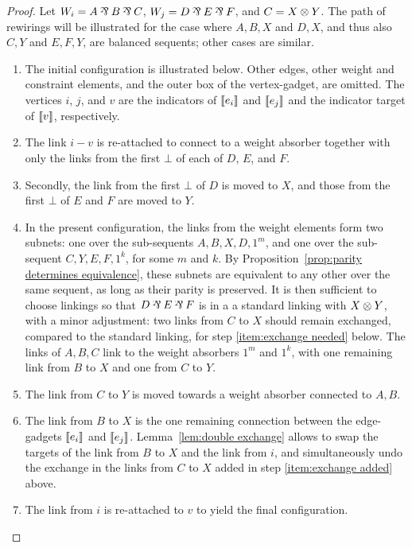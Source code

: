 \documentclass{sigplanconf-modified}
\begin{document}
\begin{proof}
Let $W_i=A\parr B\parr C$, $W_j=D\parr E\parr F$, and $C=X\otimes Y$.
%
The path of rewirings will be illustrated for the case where $A,B,X$ and $D,X$, and thus also $C,Y$ and $E,F,Y$, are balanced sequents; other cases are similar.
%
\begin{enumerate}
	\item
The initial configuration is illustrated below. 
%
Other edges, other weight and constraint elements, and the outer box of the vertex-gadget, are omitted.
%
The vertices $i$, $j$, and  $v$ are the indicators of $\llbracket e_i\rrbracket$ and $\llbracket e_j\rrbracket$ and the indicator target of $\llbracket v\rrbracket$, respectively.
%


	\item
The link $i-v$ is re-attached to connect to a weight absorber together with only the links from the first $\bot$ of each of $D$, $E$, and $F$. 
%


	\item
Secondly, the link from the first $\bot$ of $D$ is moved to $X$, and those from the first $\bot$ of $E$ and $F$ are moved to $Y$.
%


	\item\label{item:exchange added}
In the present configuration, the links from the weight elements form two subnets: one over the sub-sequents $A,B,X,D,1^m$, and one over the sub-sequent $C,Y,E,F,1^k$, for some $m$ and $k$.
%
By Proposition~\ref{prop:parity determines equivalence}, these subnets are equivalent to any other over the same sequent, as long as their parity is preserved.
%
It is then sufficient to choose linkings so that $D\parr E\parr F$ is in a a standard linking with $X\otimes Y$, with a minor adjustment: two links from $C$ to $X$ should remain exchanged, compared to the standard linking, for step \ref{item:exchange needed} below.
%
The links of $A,B,C$ link to the weight absorbers $1^m$ and $1^k$, with one remaining link from $B$ to $X$ and one from $C$ to $Y$.
%
\displayOcto{\octorollC}


	\item
The link from $C$ to $Y$ is moved towards a weight absorber connected to $A,B$.
%


	\item\label{item:exchange needed}
The link from $B$ to $X$ is the one remaining connection between the edge-gadgets $\llbracket e_i\rrbracket$ and $\llbracket e_j\rrbracket$.
%
Lemma~\ref{lem:double exchange} allows to swap the targets of the link from $B$ to $X$ and the link from $i$, and simultaneously undo the exchange in the links from $C$ to $X$ added in step \ref{item:exchange added} above.
%


	\item
The link from $i$ is re-attached to $v$ to yield the final configuration.
%
\end{enumerate}
\end{proof}
\end{document}
